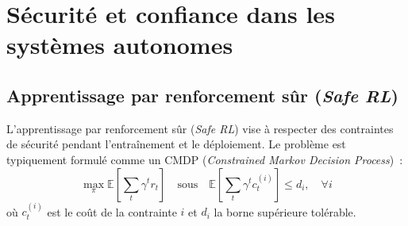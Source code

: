 \begin{table}[htbp]
\centering
\caption{Comparaison des approches de durabilité carbone dans les TIC. ACV~: analyse du cycle de vie. CS~: détection comprimée. CI~: intensité carbone.}
\label{tab:carbon-comparison}
\end{table}


\section{Sécurité et confiance dans les systèmes autonomes}\label{sec:revlit-security}

\subsection{Apprentissage par renforcement sûr (\emph{Safe RL})}

L'apprentissage par renforcement sûr (\emph{Safe RL}) vise à respecter des contraintes de sécurité pendant l'entraînement et le déploiement. Le problème est typiquement formulé comme un CMDP (\emph{Constrained Markov Decision Process})~:
\begin{equation}
    \max_\pi \mathbb{E}\left[\sum_t \gamma^t r_t\right] \quad \text{sous} \quad \mathbb{E}\left[\sum_t \gamma^t c_t^{(i)}\right] \leq d_i, \quad \forall i
\end{equation}
où $c_t^{(i)}$ est le coût de la contrainte $i$ et $d_i$ la borne supérieure tolérable.

